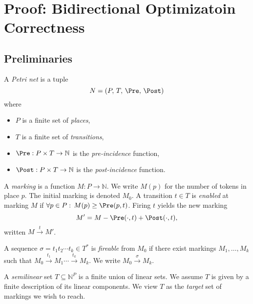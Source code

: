 
\section{Proof: Bidirectional Optimizatoin Correctness}
\label{appendix:BidirectionalProof}





	\subsection{Preliminaries}
	
	\begin{definition}
		A \emph{Petri net} is a tuple
		\[
		N = (P,\,T,\,\Pre,\,\Post)
		\]
		where
		\begin{itemize}
			\item $P$ is a finite set of \emph{places},
			\item $T$ is a finite set of \emph{transitions},
			\item $\Pre: P\times T \to \mathbb{N}$ is the \emph{pre-incidence} function,
			\item $\Post: P\times T \to \mathbb{N}$ is the \emph{post-incidence} function.
		\end{itemize}
	\end{definition}
	
	\begin{definition}[Marking]
		A \emph{marking} is a function $M: P \to \mathbb{N}$. We write $M(p)$
		for the number of tokens in place $p$.  The initial marking is
		denoted $M_0$.  A transition $t\in T$ is \emph{enabled} at marking
		$M$ if $\forall p\in P:\,M(p)\ge\Pre(p,t)$.  Firing $t$ yields the
		new marking
		\[
		M' = M - \Pre(\cdot,t) + \Post(\cdot,t),
		\]
		written $M \xrightarrow{t} M'$.
	\end{definition}
	
	\begin{definition}
		A sequence $\sigma = t_1 t_2 \cdots t_k \in T^*$ is \emph{fireable}
		from $M_0$ if there exist markings $M_1,\dots,M_k$ such that
		$M_0\xrightarrow{t_1}M_1\cdots\xrightarrow{t_k}M_k$.  We write
		$M_0 \xrightarrow{\sigma} M_k$.
	\end{definition}
	
	\begin{definition}
		A \emph{semilinear} set $T\subseteq \mathbb{N}^P$ is a finite union of
		linear sets.  We assume $T$ is given by a finite description of its
		linear components.  We view $T$ as the \emph{target} set of markings
		we wish to reach.
	\end{definition}
	
